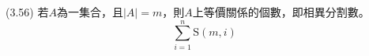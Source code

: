 \item \begin{theorem}{(3.56)} 若$A$為一集合，且$|A| = m$，則$A$上等價關係的個數，即相異分割數。
    \begin{equation}
        \sum_{i = 1}^{n} \text{S}(m, i)
    \end{equation}
\end{theorem}
